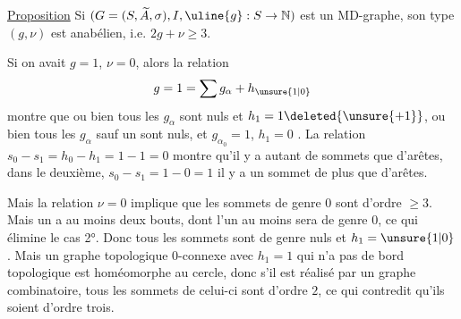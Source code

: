 \uline{Proposition} Si $(G=(S,\widetilde A,\sigma),I,\uline{g}:S\to\mathbb N)$ est un MD-graphe, son type $(g,\nu)$ est anabélien, i.e. $2g+\nu\geq3$.

Si on avait $g=1$, $\nu=0$, alors la relation
\[
g=1=\sum g_\alpha+h_{\unsure{1|0}}
\]
montre que ou bien tous les $g_\alpha$ sont nuls et $h_1=1\deleted{\unsure{+1}}$, ou bien tous les $g_\alpha$ sauf un  sont nuls, et $g_{\alpha_0}=1$, $h_1=0$ .  La relation $s_0-s_1=h_0-h_1=1-1=0$ montre qu'il y a autant de sommets que d'arêtes, dans le deuxième, $s_0-s_1=1-0=1$ il y a un sommet de plus que d'arêtes.

Mais la relation $\nu=0$ implique que les sommets de genre $0$ sont d'ordre $\geq3$.  Mais un   a au moins deux bouts, dont l'un au moins sera de genre $0$, ce qui élimine le cas 2°. Donc tous les sommets sont de genre nuls  et $h_1=\unsure{1|0}$. Mais  un graphe topologique $0$-connexe avec $h_1=1$ qui n'a pas de  bord topologique est homéomorphe au cercle, donc s'il est réalisé par un graphe combinatoire, tous les sommets de celui-ci sont d'ordre $2$, ce qui contredit qu'ils soient d'ordre trois.
